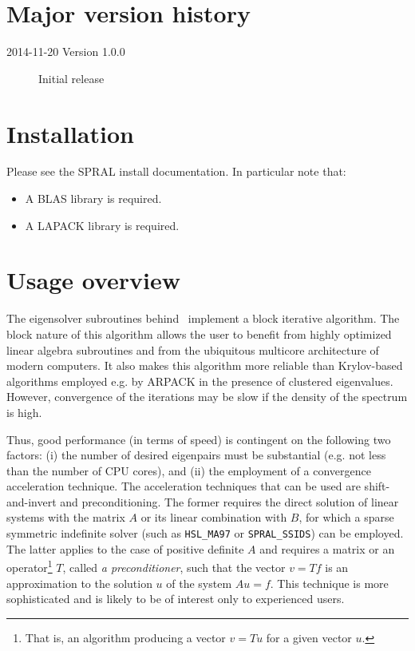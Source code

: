 \section*{Major version history}
\begin{description}
\item[2014-11-20 Version 1.0.0] Initial release
\end{description}


\section{Installation}
Please see the SPRAL install documentation. In particular note that:
\begin{itemize}
   \item A BLAS library is required.
   \item A LAPACK library is required.
\end{itemize}

\section{Usage overview}

\label{sec:summary}

The eigensolver subroutines
behind \fullpackagename\
implement a block iterative algorithm.
The block nature of this algorithm allows the user
to benefit from highly optimized linear algebra subroutines
and from the ubiquitous multicore architecture
of modern computers.
It also makes this algorithm more reliable
than Krylov-based algorithms employed e.g. by ARPACK
in the presence of clustered eigenvalues.
However, convergence of the iterations may be slow
if the density of the spectrum is high.

Thus, good performance 
(in terms of speed)
is contingent on the following two factors:
(i) the number of desired
eigenpairs must be substantial
(e.g. not less than the number of CPU cores),
and
(ii) the employment of a convergence acceleration technique.
The acceleration techniques that can be used 
are shift-and-invert and preconditioning.
The former requires
the direct solution of linear systems
with the matrix $A$ or its linear combination with $B$,
for which a sparse symmetric indefinite solver
(such as {\tt HSL\_MA97} or {\tt SPRAL\_SSIDS}) can be employed.
The latter applies to the case of positive definite $A$ and
requires a matrix or an operator\footnote{
That is, an algorithm producing a vector $v = T u$ for a given
vector $u$.
}
$T$, called {\em a preconditioner},
such that the vector
$v = T f$ is an approximation to the solution $u$
of the system $A u = f$.
This technique is more sophisticated
and is likely to be of interest only to experienced users.

